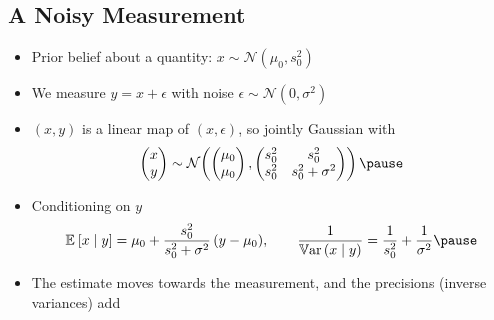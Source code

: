 \begin{slide}
\section[-2]{A Noisy Measurement}

\begin{PauseHighLight}
  \begin{itemize}
  \item Prior belief about a quantity: $x\sim\mathcal{N}(\mu_0, s_0^2)$\pause
  \item We measure $y = x + \epsilon$ with noise
    $\epsilon\sim\mathcal{N}(0,\sigma^2)$\pause
  \item $(x,y)$ is a linear map of $(x,\epsilon)$, so jointly Gaussian with
    \begin{align*}
      \begin{pmatrix} x \\ y\end{pmatrix} \sim
      \mathcal{N}\!\left(\begin{pmatrix}\mu_0\\ \mu_0\end{pmatrix},
      \begin{pmatrix} s_0^2 & s_0^2 \\ s_0^2 & s_0^2+\sigma^2\end{pmatrix}\right)\pause
    \end{align*}
  \item Conditioning on $y$
    \begin{align*}
      \av{x\mid y} = \mu_0 + \frac{s_0^2}{s_0^2+\sigma^2}\,(y-\mu_0),
      \qquad
      \frac{1}{\Var{x\mid y}} = \frac{1}{s_0^2} + \frac{1}{\sigma^2}\pause
    \end{align*}
  \item The estimate moves towards the measurement, and the precisions
    (inverse variances) add\pause
  \end{itemize}
\end{PauseHighLight}

\end{slide}


